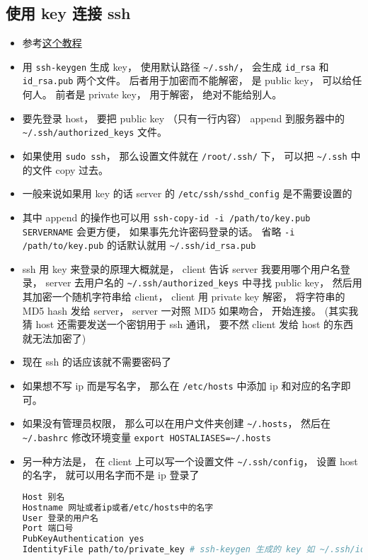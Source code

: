 \subsection{使用 key 连接 ssh}
\begin{itemize}
\item 参考\href{https://www.digitalocean.com/community/tutorials/ssh-essentials-working-with-ssh-servers-clients-and-keys}{这个教程}
\item 用 \verb`ssh-keygen` 生成 key， 使用默认路径 \verb`~/.ssh/`， 会生成 \verb`id_rsa` 和 \verb`id_rsa.pub` 两个文件。 后者用于加密而不能解密， 是 public key， 可以给任何人。 前者是 private key， 用于解密， 绝对不能给别人。
\item 要先登录 host， 要把 public key （只有一行内容） append 到服务器中的 \verb`~/.ssh/authorized_keys` 文件。
\item 如果使用 \verb|sudo ssh|， 那么设置文件就在 \verb|/root/.ssh/| 下， 可以把 \verb|~/.ssh| 中的文件 copy 过去。
\item 一般来说如果用 key 的话 server 的 \verb`/etc/ssh/sshd_config` 是不需要设置的
\item 其中 append 的操作也可以用 \verb`ssh-copy-id -i /path/to/key.pub SERVERNAME` 会更方便， 如果事先允许密码登录的话。 省略 \verb|-i /path/to/key.pub| 的话默认就用 \verb|~/.ssh/id_rsa.pub|
\item ssh 用 key 来登录的原理大概就是， client 告诉 server 我要用哪个用户名登录， server 去用户名的 \verb`~/.ssh/authorized_keys` 中寻找 public key， 然后用其加密一个随机字符串给 client， client 用 private key 解密， 将字符串的 MD5 hash 发给 server， server 一对照 MD5 如果吻合， 开始连接。  (其实我猜 host 还需要发送一个密钥用于 ssh 通讯， 要不然 client 发给 host 的东西就无法加密了)
\item 现在 ssh 的话应该就不需要密码了
\item 如果想不写 ip 而是写名字， 那么在 \verb|/etc/hosts| 中添加 ip 和对应的名字即可。
\item 如果没有管理员权限， 那么可以在用户文件夹创建 \verb|~/.hosts|， 然后在 \verb|~/.bashrc| 修改环境变量 \verb|export HOSTALIASES=~/.hosts|
\item 另一种方法是， 在 client 上可以写一个设置文件 \verb`~/.ssh/config`， 设置 host 的名字， 就可以用名字而不是 ip 登录了
\begin{lstlisting}[language=bash]
Host 别名
Hostname 网址或者ip或者/etc/hosts中的名字
User 登录的用户名
Port 端口号
PubKeyAuthentication yes
IdentityFile path/to/private_key # ssh-keygen 生成的 key 如 ~/.ssh/id_rsa


\end{lstlisting}
\end{itemize}

